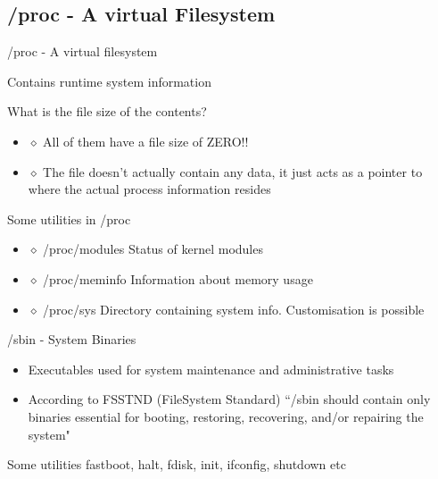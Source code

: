 \documentclass{beamer}
\begin{document}
\subsection{/proc - A virtual Filesystem}
\begin{frame}{/proc - A virtual filesystem}

Contains runtime system information
\pause


\begin{block}{What is the file size of the contents? }
\begin{itemize}
\item[] $\diamond$ All of them have a file size of ZERO!!
\item[] $\diamond$ The file doesn't actually contain any data, it just acts as a
pointer to where the actual process information resides
\end{itemize}
\end{block}

\pause

\begin{block}{Some utilities in /proc}
\begin{itemize}
\item[] $\diamond$  /proc/modules Status of kernel modules 
\item[] $\diamond$ /proc/meminfo Information about memory usage
\item[] $\diamond$ /proc/sys Directory containing system info. Customisation is possible
\end{itemize}
\end{block}
\end{frame}

\begin{frame}{/sbin - System Binaries}
\begin{itemize}
\item  Executables used for system maintenance and administrative tasks
\item According to FSSTND (FileSystem Standard) ``/sbin should contain only binaries essential for booting, restoring,
 recovering, and/or repairing the system"
\end{itemize}
\begin{block}{Some utilities}
fastboot, halt, fdisk, init, ifconfig, shutdown etc
\end{block}
\end{frame}
\end{document}
